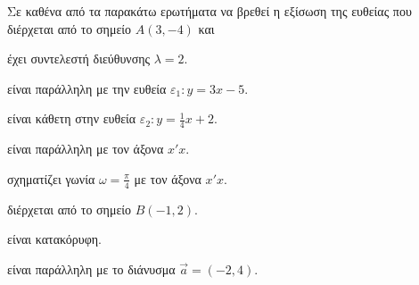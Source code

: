 Σε καθένα από τα παρακάτω ερωτήματα να βρεθεί η εξίσωση της ευθείας που διέρχεται από το σημείο $ A(3,-4) $ και
\begin{alist}
\item έχει συντελεστή διεύθυνσης $ \lambda=2 $.
\item είναι παράλληλη με την ευθεία $ \varepsilon_1: y=3x-5 $.
\item είναι κάθετη στην ευθεία $ \varepsilon_2:y=\frac{1}{4}x+2 $.
\item είναι παράλληλη με τον άξονα $ x'x $.
\item σχηματίζει γωνία $ \omega=\frac{\pi}{4} $ με τον άξονα $ x'x $.
\item διέρχεται από το σημείο $ B(-1,2) $.
\item είναι κατακόρυφη.
\item είναι παράλληλη με το διάνυσμα $ \vec{a}=(-2,4) $.
\end{alist}
